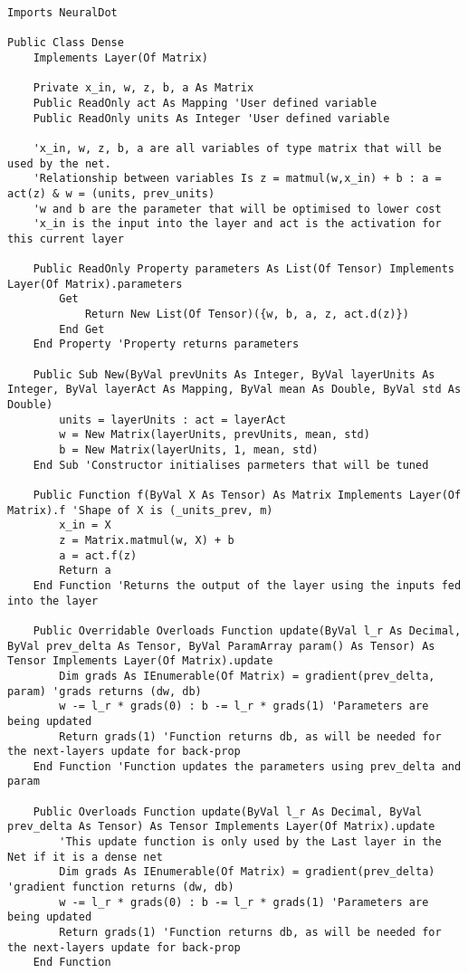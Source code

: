 \begin{verbatim}
Imports NeuralDot

Public Class Dense
    Implements Layer(Of Matrix)

    Private x_in, w, z, b, a As Matrix
    Public ReadOnly act As Mapping 'User defined variable
    Public ReadOnly units As Integer 'User defined variable

    'x_in, w, z, b, a are all variables of type matrix that will be used by the net. 
    'Relationship between variables Is z = matmul(w,x_in) + b : a = act(z) & w = (units, prev_units)
    'w and b are the parameter that will be optimised to lower cost
    'x_in is the input into the layer and act is the activation for this current layer 

    Public ReadOnly Property parameters As List(Of Tensor) Implements Layer(Of Matrix).parameters
        Get
            Return New List(Of Tensor)({w, b, a, z, act.d(z)})
        End Get
    End Property 'Property returns parameters

    Public Sub New(ByVal prevUnits As Integer, ByVal layerUnits As Integer, ByVal layerAct As Mapping, ByVal mean As Double, ByVal std As Double)
        units = layerUnits : act = layerAct
        w = New Matrix(layerUnits, prevUnits, mean, std)
        b = New Matrix(layerUnits, 1, mean, std)
    End Sub 'Constructor initialises parmeters that will be tuned

    Public Function f(ByVal X As Tensor) As Matrix Implements Layer(Of Matrix).f 'Shape of X is (_units_prev, m)
        x_in = X
        z = Matrix.matmul(w, X) + b
        a = act.f(z)
        Return a
    End Function 'Returns the output of the layer using the inputs fed into the layer

    Public Overridable Overloads Function update(ByVal l_r As Decimal, ByVal prev_delta As Tensor, ByVal ParamArray param() As Tensor) As Tensor Implements Layer(Of Matrix).update
        Dim grads As IEnumerable(Of Matrix) = gradient(prev_delta, param) 'grads returns (dw, db)
        w -= l_r * grads(0) : b -= l_r * grads(1) 'Parameters are being updated
        Return grads(1) 'Function returns db, as will be needed for the next-layers update for back-prop
    End Function 'Function updates the parameters using prev_delta and  param

    Public Overloads Function update(ByVal l_r As Decimal, ByVal prev_delta As Tensor) As Tensor Implements Layer(Of Matrix).update
        'This update function is only used by the Last layer in the Net if it is a dense net
        Dim grads As IEnumerable(Of Matrix) = gradient(prev_delta) 'gradient function returns (dw, db)
        w -= l_r * grads(0) : b -= l_r * grads(1) 'Parameters are being updated
        Return grads(1) 'Function returns db, as will be needed for the next-layers update for back-prop
    End Function


\end{verbatim}
